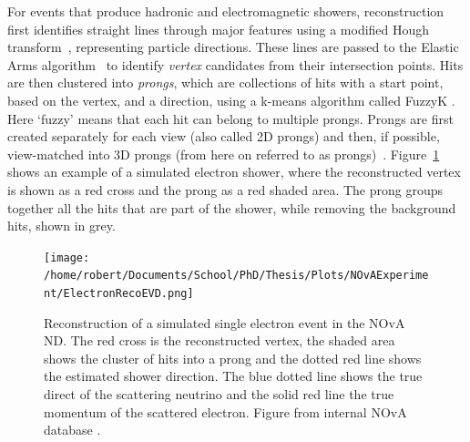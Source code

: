 For events that produce hadronic and electromagnetic showers, reconstruction first identifies straight lines through major features using a modified Hough transform~\cite{HoughTransform.pdf}, representing particle directions. These lines are passed to the Elastic Arms algorithm~\cite{ElasticArms.pdf} to identify \textit{vertex} candidates from their intersection points. Hits are then clustered into \textit{prongs}, which are collections of hits with a start point, based on the vertex, and a direction, using a k-means algorithm called FuzzyK \cite{FuzzyKClustering.pdf,FuzzyKFuzzyness.pdf}. Here `fuzzy' means that each hit can belong to multiple prongs. Prongs are first created separately for each view (also called 2D prongs) and then, if possible, view-matched into 3D prongs (from here on referred to as prongs)~\cite{NOvAReco.pdf}. Figure~\ref{fig:NOvARecoEVD} shows an example of a  simulated electron shower, where the reconstructed vertex is shown as a red cross and the prong as a red shaded area. The prong groups together all the hits that are part of the shower, while removing the background hits, shown in grey.

\begin{figure}[ht]
\centering
\texttt{[image: /home/robert/Documents/School/PhD/Thesis/Plots/NOvAExperiment/ElectronRecoEVD.png]}
\caption[NOvA reconstruction of a single electron]{Reconstruction of a simulated single electron event in the \acrshort{NOvA} \acrshort{ND}. The red cross is the reconstructed vertex, the shaded area shows the cluster of hits into a prong and the dotted red line shows the estimated shower direction. The blue dotted line shows the true direct of the scattering neutrino and the solid red line the true momentum of the scattered electron. Figure from internal \acrshort{NOvA} database \cite{NOvA-doc-13862}.}
\label{fig:NOvARecoEVD}
\end{figure}

